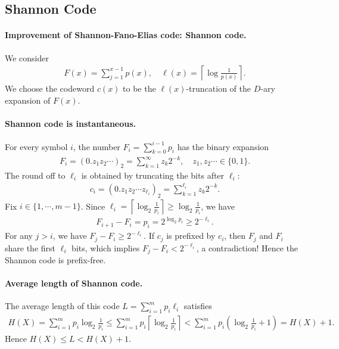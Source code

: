 \documentclass{article}
\numberwithin{equation}{section}
\theoremstyle{plain}
\theoremstyle{definition}
\begin{document}
\newpage
\subsection{Shannon Code}
\paragraph{Improvement of Shannon-Fano-Elias code: Shannon code.} We consider
\begin{align*}
	F(x)=\sum_{j=1}^{x-1} p(x),\quad \ell(x)=\left\lceil\log\frac{1}{p(x)}\right\rceil.
\end{align*}
We choose the codeword $c(x)$ to be the $\ell(x)$-truncation of the $D$-ary expansion of $F(x)$. 

\paragraph{Shannon code is instantaneous.} For every symbol $i$, the number $F_i=\sum_{k=0}^{i-1}p_i$ has the binary expansion
	\begin{align*}
		F_i=(0.z_1z_2\cdots)_2=\sum_{k=1}^\infty z_k2^{-k},\quad z_1,z_2\cdots\in\{0,1\}.
	\end{align*}
	The round off to $\ell_i$ is obtained by truncating the bits after $\ell_i$:
	\begin{align*}
		c_i=(0.z_1z_2\cdots z_{\ell_i})_2=\sum_{k=1}^{\ell_i} z_k2^{-k}.
	\end{align*}
	Fix $i\in\{1,\cdots,m-1\}$. Since $\ell_i=\left\lceil\log_2\frac{1}{p_i}\right\rceil\geq\log_2\frac{1}{p_i}$, we have
	\begin{align*}
		F_{i+1}-F_i=p_i=2^{\log_2 p_i}\geq 2^{-\ell_i}.
	\end{align*}
	For any $j>i$, we have $F_j-F_i\geq 2^{-\ell_i}$. If $c_j$ is prefixed by $c_i$, then $F_j$ and $F_i$ share the first $\ell_i$ bits, which implies $F_j-F_i<2^{-\ell_i}$, a contradiction! Hence the Shannon code is prefix-free.
	
\paragraph{Average length of Shannon code.} The average length of this code $L=\sum_{i=1}^m p_i\ell_i$ satisfies
	\begin{align*}
		H(X)=\sum_{i=1}^m p_i\log_2\frac{1}{p_i}\leq\sum_{i=1}^m p_i\left\lceil\log_2\frac{1}{p_i}\right\rceil<\sum_{i=1}^m p_i\left(\log_2\frac{1}{p_i}+1\right)=H(X)+1.
	\end{align*}
	Hence $H(X)\leq L<H(X)+1$.
	
\end{document}
